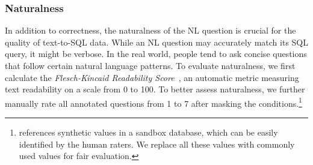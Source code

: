 \begin{table}[htb]
    \centering
    \caption{Correctness of Annotated Data}
    \vspace{-2.5mm}
    
    \label{tab:correctness_annotation}
\end{table}



\subsubsection{\textbf{Naturalness}}
In addition to correctness, the naturalness of the NL question is crucial for the quality of text-to-SQL data.
While an NL question may accurately match its SQL query, it might be verbose. In the real world, people tend to ask concise questions that follow certain natural language patterns. To evaluate naturalness, we first calculate the \textit{Flesch-Kincaid Readability Score}~\cite{flesch_score}, an automatic metric measuring text readability on a scale from 0 to 100.
To better assess naturalness, we further manually rate all annotated questions from 1 to 7 after masking the conditions.\footnote{{\tool} references synthetic values in a sandbox database, which can be easily identified by the human raters. We replace all these values with commonly used values for fair evaluation.}

\begin{table}[htb]
    \centering
        \centering
        \caption{Flesch-Kincaid Readability Score of Annotated Questions (0-100).}
        \vspace{-2.5mm}
        \label{tab:Flesch-Kincaid}
\end{table}

